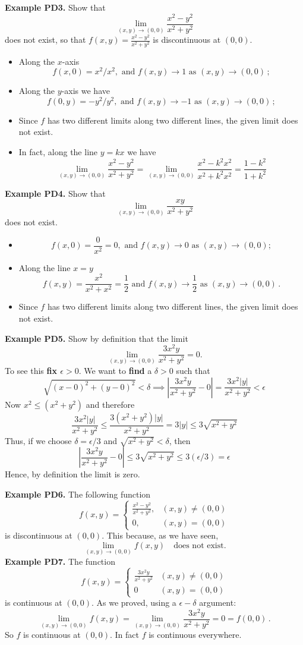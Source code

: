 \documentclass{article}
\begin{document}
\textbf{Example PD3.} Show that
$$
\lim_{(x,y) \to (0,0)} \frac{x^2-y^2}{x^2+y^2}
$$
does not exist, so that $f(x,y) = \frac{x^2-y^2}{x^2+y^2}$ is discontinuous at $(0,0)$.
\begin{itemize}
\item
Along the $x$-axis
$$
f(x,0) = x^2/x^2, \mbox{ and } f(x,y) \to 1 \mbox{ as } (x,y) \to (0,0)\,;
$$
\item
Along the $y$-axis we have
$$
f(0, y) =-y^2/y^2,\mbox{ and } f(x,y) \to -1 \mbox{ as } (x,y) \to (0,0)\,;
$$
\item
Since $f$ has two different limits along two different lines, the
given limit does not exist. 
\item
In fact, along the line $y=k x$ we have
$$
\lim_{(x,y) \to (0,0)} \frac{x^2 - y^2}{x^2+y^2}=\lim_{(x,y) \to (0,0)} \frac{x^2-k^2 x^2}{x^2+k^2 x^2}= \frac{1-k^2}{1+k^2}
$$
\end{itemize}


\textbf{Example PD4.} Show that
$$
\lim_{(x,y) \to (0,0)} \frac{xy}{x^2+y^2}
$$
does not exist. 
\begin{itemize}
\item
$$
f(x,0) = \frac{0}{x^2} = 0,  \mbox{ and } f(x,y) \to 0 \mbox{ as } (x,y) \to (0,0);
$$
\item
Along the line $x=y$
$$
f(x, y) =\frac{x^2}{x^2+x^2} = \frac{1}{2}  \mbox{ and } f(x,y) \to \frac{1}{2} \mbox{ as } (x,y) \to (0,0)\,.
$$
\item
Since $f$ has two different limits along two different lines, the
given limit does not exist.
\end{itemize}


\textbf{Example PD5.} Show by definition that the limit
$$
\lim_{(x,y) \to (0,0)} \frac{3x^2 y}{x^2+y^2}=0.
$$
To see this \textbf{fix $\epsilon >0$}. We want to \textbf{find} a $\delta >0$ such that
$$
\sqrt{ (x-0)^2 +(y-0)^2 } < \delta \implies \left| \frac{3x^2 y}{x^2+y^2} -0 \right| = \frac{3x^2 |y|}{x^2+y^2} < \epsilon
$$
Now $x^2\leq(x^2+y^2)$ and therefore
$$
\frac{3x^2 |y|}{x^2+y^2} \leq \frac{3(x^2+y^2) |y|}{x^2+y^2} = 3|y| \le 3 \sqrt{x^2+ y^2}
$$
Thus, if we choose $\delta = \epsilon/3$ and $\sqrt{x^2 +y^2} < \delta$,
then
$$
\left| \frac{3x^2y}{x^2+y^2} -0 \right| \le 3 \sqrt{x^2+ y^2} \le 3( \epsilon/3)=\epsilon
$$
Hence, by definition the limit is zero.


\textbf{Example PD6.} The following function
$$
 f(x,y)= \left\{ \begin{array}{cl} \frac{x^2 - y^2}{x^2+y^2}, & (x,y) \ne (0,0)\\
0, & (x,y) = (0,0)
\end{array} \right.
$$
is discontinuous at $(0,0)$. This because, as we have seen,
$$
\lim_{(x,y) \to (0,0)} f(x,y) \quad \mbox{does not exist.}
$$
\textbf{Example PD7.} The function
$$
f(x,y)= \left\{ \begin{array}{cl} \frac{3x^2 y}{x^2+y^2} & (x,y) \ne (0,0)\\
0 & (x,y) = (0,0)
\end{array}\right.
$$
is continuous at $(0,0)$. As we proved, using a $\epsilon - \delta$ argument:
$$
\lim_{(x,y) \to (0,0)} f(x,y)=  \lim_{(x,y) \to (0,0)} \frac{3x^2
y}{x^2+y^2}=0=f(0,0)\,.
$$
So $f$ is continuous at $(0,0)$. In fact $f$ is continuous everywhere.
\end{document}
